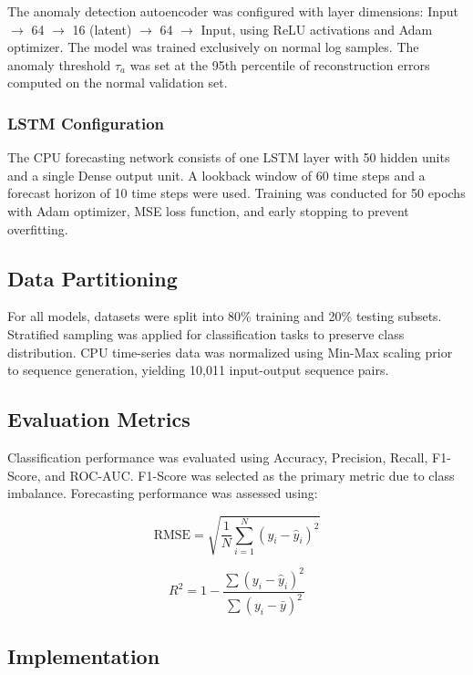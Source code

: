 \documentclass[conference]{IEEEtran}
\begin{document}
The anomaly detection autoencoder was configured with layer dimensions: Input $\rightarrow$ 64 $\rightarrow$ 16 (latent) $\rightarrow$ 64 $\rightarrow$ Input, using ReLU activations and Adam optimizer. The model was trained exclusively on normal log samples. The anomaly threshold $\tau_a$ was set at the 95th percentile of reconstruction errors computed on the normal validation set.

\subsubsection{LSTM Configuration}

The CPU forecasting network consists of one LSTM layer with 50 hidden units and a single Dense output unit. A lookback window of 60 time steps and a forecast horizon of 10 time steps were used. Training was conducted for 50 epochs with Adam optimizer, MSE loss function, and early stopping to prevent overfitting.

\subsection{Data Partitioning}

For all models, datasets were split into 80\% training and 20\% testing subsets. Stratified sampling was applied for classification tasks to preserve class distribution. CPU time-series data was normalized using Min-Max scaling prior to sequence generation, yielding 10,011 input-output sequence pairs.

\subsection{Evaluation Metrics}

Classification performance was evaluated using Accuracy, Precision, Recall, F1-Score, and ROC-AUC. F1-Score was selected as the primary metric due to class imbalance. Forecasting performance was assessed using:

\begin{equation}
\text{RMSE} = \sqrt{\frac{1}{N} \sum_{i=1}^{N} (y_i - \hat{y}_i)^2}
\end{equation}

\begin{equation}
R^2 = 1 - \frac{\sum (y_i - \hat{y}_i)^2}{\sum (y_i - \bar{y})^2}
\end{equation}

\subsection{Implementation}
\end{document}
